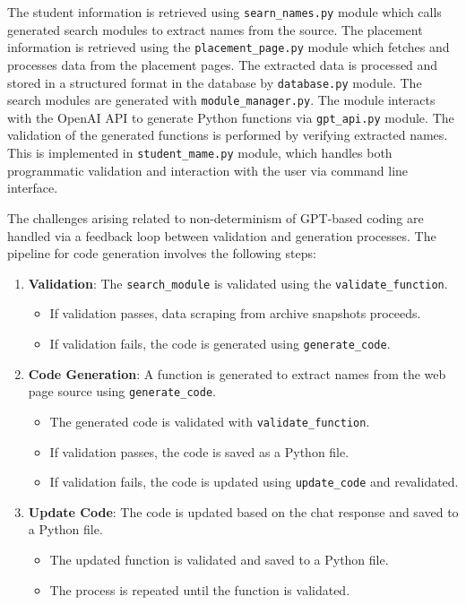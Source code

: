 \documentclass[11pt]{article}
\begin{document}
The student information is retrieved using \texttt{searn\_names.py} module which calls generated search modules to extract names from the source. The placement information is retrieved using the \texttt{placement\_page.py} module which fetches and processes data from the placement pages. The extracted data is processed and stored in a structured format in the database by \texttt{database.py} module.
%
The search modules are generated with \texttt{module\_manager.py}. The module interacts with the OpenAI API to generate Python functions via \texttt{gpt\_api.py} module. The validation of the generated functions is performed by verifying extracted names. This is implemented in \texttt{student\_mame.py} module, which handles both programmatic validation and interaction with the user via command line interface.


The challenges arising related to non-determinism of GPT-based coding are handled via a feedback loop between validation and generation processes.
%
The pipeline for code generation involves the following steps:

\begin{enumerate}
    \item \textbf{Validation}: The \texttt{search\_module} is validated using the \texttt{validate\_function}.
    \begin{itemize}
        \item If validation passes, data scraping from archive snapshots proceeds.
        \item If validation fails, the code is generated using \texttt{generate\_code}.
    \end{itemize}
    \item \textbf{Code Generation}: A function is generated to extract names from the web page source using \texttt{generate\_code}.
    \begin{itemize}
        \item The generated code is validated with \texttt{validate\_function}.
        \item If validation passes, the code is saved as a Python file.
        \item If validation fails, the code is updated using \texttt{update\_code} and revalidated.
    \end{itemize}
    \item \textbf{Update Code}: The code is updated based on the chat response and saved to a Python file.
    \begin{itemize}
        \item The updated function is validated and saved to a Python file.
        \item The process is repeated until the function is validated.
    \end{itemize}
\end{enumerate}
\end{document}
